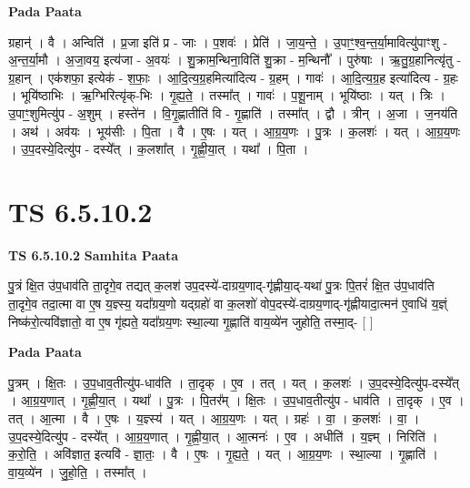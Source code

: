 \documentclass[17pt]{extarticle}
\begin{document}
\textbf{Pada Paata} \newline

ग्रहान्॑ । वै । अन्विति॑ । प्र॒जा इति॑ प्र - जाः । प॒शवः॑ । प्रेति॑ । जा॒य॒न्ते॒ । उ॒पाꣳ॒॒श्व॒न्त॒र्या॒मावित्यु॑पाꣳशु - अ॒न्त॒र्या॒मौ । अ॒जा॒वय॒ इत्य॑जा - अ॒वयः॑ । शु॒क्राम॒न्थिना॒विति॑ शु॒क्रा - म॒न्थिनौ᳚ । पुरु॑षाः । ऋ॒तु॒ग्र॒हानित्यृ॑तु - ग्र॒हान् । एक॑शफा॒ इत्येक॑ - श॒फाः॒ । आ॒दि॒त्य॒ग्र॒हमित्या॑दित्य - ग्र॒हम् । गावः॑ । आ॒दि॒त्य॒ग्र॒ह इत्या॑दित्य - ग्र॒हः । भूयि॑ष्ठाभिः । ऋ॒ग्भिरित्यृ॑क्-भिः । गृ॒ह्य॒ते॒ । तस्मा᳚त् । गावः॑ । प॒शू॒नाम् । भूयि॑ष्ठाः । यत् । त्रिः । उ॒पाꣳ॒॒शुमित्यु॑प - अ॒शुम् । हस्ते॑न । वि॒गृ॒ह्णातीति॑ वि - गृ॒ह्णाति॑ । तस्मा᳚त् । द्वौ । त्रीन् । अ॒जा । ज॒नय॑ति । अथ॑ । अव॑यः । भूय॑सीः । पि॒ता । वै । ए॒षः । यत् । आ॒ग्र॒य॒णः । पु॒त्रः । क॒लशः॑ । यत् । आ॒ग्र॒य॒णः । उ॒प॒दस्ये॒दित्यु॑प - दस्ये᳚त् । क॒लशा᳚त् । गृ॒ह्णी॒या॒त् । यथा᳚ । पि॒ता ।  \newline




\section*{ TS 6.5.10.2 }

\textbf{TS 6.5.10.2 } \newline
\textbf{Samhita Paata} \newline

पु॒त्रं क्षि॒त उ॑प॒धाव॑ति ता॒दृगे॒व तद्यत् क॒लश॑ उप॒दस्ये॑-दाग्रय॒णाद्-गृ॑ह्णीया॒द्-यथा॑ पु॒त्रः पि॒तरं॑ क्षि॒त उ॑प॒धाव॑ति ता॒दृगे॒व तदा॒त्मा वा ए॒ष य॒ज्ञ्स्य॒ यदा᳚ग्रय॒णो यद्ग्रहो॑ वा क॒लशो॑ वोप॒दस्ये॑-दाग्रय॒णाद्-गृ॑ह्णीयादा॒त्मन॑ ए॒वाधि॑ य॒ज्ञ्ं निष्क॑रो॒त्यवि॑ज्ञातो॒ वा ए॒ष गृ॑ह्यते॒ यदा᳚ग्रय॒णः स्था॒ल्या गृ॒ह्णाति॑ वाय॒व्ये॑न जुहोति॒ तस्मा॒द्- [  ] \newline

\textbf{Pada Paata} \newline

पु॒त्रम् । क्षि॒तः । उ॒प॒धाव॒तीत्यु॑प-धाव॑ति । ता॒दृक् । ए॒व । तत् । यत् । क॒लशः॑ । उ॒प॒दस्ये॒दित्यु॑प-दस्ये᳚त् । आ॒ग्र॒य॒णात् । गृ॒ह्णी॒या॒त् । यथा᳚ । पु॒त्रः । पि॒तर᳚म् । क्षि॒तः । उ॒प॒धाव॒तीत्यु॑प - धाव॑ति । ता॒दृक् । ए॒व । तत् । आ॒त्मा । वै । ए॒षः । य॒ज्ञ्स्य॑ । यत् । आ॒ग्र॒य॒णः । यत् । ग्रहः॑ । वा॒ । क॒लशः॑ । वा॒ । उ॒प॒दस्ये॒दित्यु॑प - दस्ये᳚त् । आ॒ग्र॒य॒णात् । गृ॒ह्णी॒या॒त् । आ॒त्मनः॑ । ए॒व । अधीति॑ । य॒ज्ञ्म् । निरिति॑ । क॒रो॒ति॒ । अवि॑ज्ञात॒ इत्यवि॑ - ज्ञा॒तः॒ । वै । ए॒षः । गृ॒ह्य॒ते॒ । यत् । आ॒ग्र॒य॒णः । स्था॒ल्या । गृ॒ह्णाति॑ । वा॒य॒व्ये॑न । जु॒हो॒ति॒ । तस्मा᳚त् ।  \newline
\end{document}
